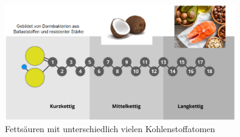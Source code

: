 \documentclass[xcolor=dvipsnames]{beamer}
\begin{document}
\begin{frame}[allowframebreaks]
        \framebreak

        \begin{figure}
            \centering
            \includegraphics[width=10cm]{../images/fs_2.png}
            \caption{Fettsäuren mit unterschiedlich vielen Kohlenstoffatomen}
        \end{figure}
    \end{frame}
\end{document}
